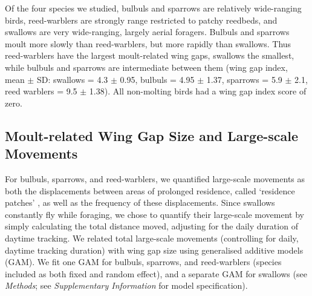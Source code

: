 Of the four species we studied, bulbuls and sparrows are relatively wide-ranging birds, reed-warblers are strongly range restricted to patchy reedbeds, and swallows are very wide-ranging, largely aerial foragers.
Bulbuls and sparrows moult more slowly than reed-warblers, but more rapidly than swallows.
Thus reed-warblers have the largest moult-related wing gaps, swallows the smallest, while bulbuls and sparrows are intermediate between them {(wing gap index, mean $\pm$ SD: swallows = 4.3 $\pm$ 0.95, bulbuls = 4.95 $\pm$ 1.37, sparrows = 5.9 $\pm$ 2.1, reed warblers = 9.5 $\pm$ 1.38)}.
All non-molting birds had a wing gap index score of zero.

\subsection*{Moult-related Wing Gap Size and Large-scale Movements}

For bulbuls, sparrows, and reed-warblers, we quantified large-scale movements as both the displacements between areas of prolonged residence, called `residence patches' \parencite{gupte2022d}, as well as the frequency of these displacements.
Since swallows constantly fly while foraging, we chose to quantify their large-scale movement by simply calculating the total distance moved, adjusting for the daily duration of daytime tracking.
We related total large-scale movements (controlling for daily, daytime tracking duration) with wing gap size using generalised additive models (GAM).
We fit one GAM for bulbuls, sparrows, and reed-warblers (species included as both fixed and random effect), and a separate GAM for swallows (see \textit{Methods}; see \textit{Supplementary Information} for model specification).

